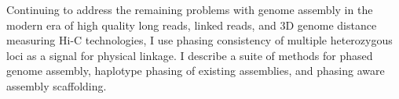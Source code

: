 \documentclass[12pt]{article}
\begin{document}
\par{
Continuing to address the remaining problems with genome assembly in the modern era of high quality long reads, linked reads, and 3D genome distance measuring Hi-C technologies, I use phasing consistency of multiple heterozygous loci as a signal for physical linkage. I describe a suite of methods for phased genome assembly, haplotype phasing of existing assemblies, and phasing aware assembly scaffolding.  
}
\end{document}
